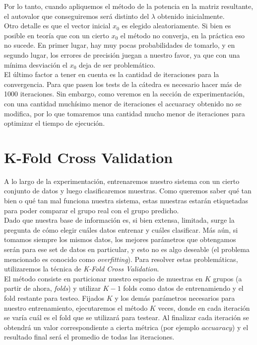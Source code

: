 Por lo tanto, cuando apliquemos el método de la potencia en la matriz resultante, el autovalor que conseguiremos será distinto del $\lambda$ obtenido inicialmente. \\

Otro detalle es que el vector inicial $x_0$ es elegido aleatoriamente. Si bien es posible en teoría que con un cierto $x_0$ el método no converja, en la práctica eso no sucede. En primer lugar, hay muy pocas probabilidades de tomarlo, y en segundo lugar, los errores de precisión juegan a nuestro favor, ya que con una mínima desviación el $x_0$ deja de ser problemático. \\

El último factor a tener en cuenta es la cantidad de iteraciones para la convergencia. Para que pasen los tests de la cátedra es necesario hacer más de 1000 iteraciones. Sin embargo, como veremos en la sección de experimentación, con una cantidad muchísimo menor de iteraciones el accuaracy obtenido no se modifica, por lo que tomaremos una cantidad mucho menor de iteraciones para optimizar el tiempo de ejecución. \\

\newpage
\section{K-Fold Cross Validation}

A lo largo de la experimentación, entrenaremos nuestro sistema con un cierto conjunto de datos y luego clasificaremos muestras. Como queremos saber qué tan bien o qué tan mal funciona nuestra sistema, estas muestras estarán etiquetadas para poder comparar el grupo real con el grupo predicho. \\

Dado que nuestra base de información es, si bien extensa, limitada, surge la pregunta de cómo elegir cuáles datos entrenar y cuáles clasificar. Más aún, si tomamos siempre los mismos datos, los mejores parámetros que obtengamos serán para ese set de datos en particular, y esto no es algo deseable (el problema mencionado es conocido como \textit{overfitting}). Para resolver estas problemáticas, utilizaremos la técnica de \textit{K-Fold Cross Validation}. \\

El método consiste en particionar nuestro espacio de muestras en $K$ grupos (a partir de ahora, \textit{folds}) y utilizar $K - 1$ folds como datos de entrenamiendo y el fold restante para testeo. Fijados $K$ y los demás parámetros necesarios para nuestro entrenamiento, ejecutaremos el método $K$ veces, donde en cada iteración se varía cuál es el fold que se utilizará para testear. Al finalizar cada iteración se obtendrá un valor correspondiente a cierta métrica (por ejemplo $accuaracy$) y el resultado final será el promedio de todas las iteraciones. \\

